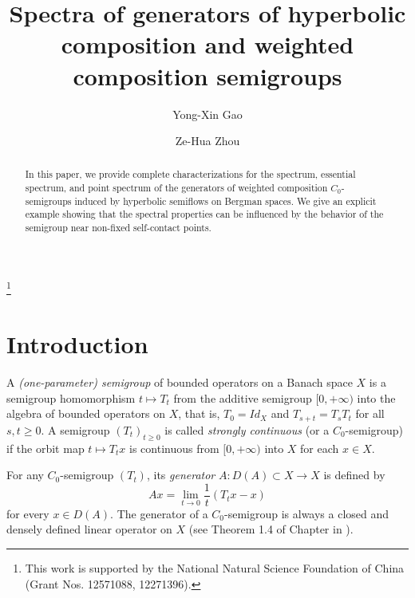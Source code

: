 \documentclass{amsart}
\theoremstyle{proclaim}
\theoremstyle{fancyproclaim}
\theoremstyle{definition}
\theoremstyle{fancystatement}
\numberwithin{equation}{section}
\begin{document}
\title[Spectra of hyperbolic weighted composition semigroups]{Spectra of generators of hyperbolic composition and weighted composition semigroups}

\author{Yong-Xin Gao}
\address{Yong-Xin Gao\\
School of Mathematical Sciences and LPMC, Nankai University, Tianjin 300071, P.R. China.}

\author{Ze-Hua Zhou}
\address{Ze-Hua Zhou\\
School of Mathematics, Tianjin University, Tianjin 300354, P.R. China.}


\date{}
\thanks{This work is supported by the National Natural Science Foundation of China (Grant Nos. 12571088, 12271396).}
\begin{abstract}
In this paper, we provide complete characterizations for the spectrum, essential spectrum, and point spectrum of the generators of weighted composition $C_0$-semigroups induced by hyperbolic semiflows on Bergman spaces. We give an explicit example showing that the spectral properties can be influenced by the behavior of the semigroup near non-fixed self-contact points.
\end{abstract}

\maketitle



\section{Introduction}\label{sec1}

A \emph{(one-parameter) semigroup} of bounded operators on a Banach space $X$ is a semigroup homomorphism $t\mapsto T_t$ from the additive semigroup $[0,+\infty)$ into the algebra of bounded operators on $X$, that is, $T_0 = Id_X$ and $T_{s+t} = T_sT_t$ for all $s,t\geq 0$. A semigroup $(T_t)_{t\geq0}$ is called \emph{strongly continuous} (or a $C_0$-semigroup) if the orbit map $t\mapsto T_tx$ is continuous from $[0,+\infty)$ into $X$ for each $x \in X$. 

For any $C_0$-semigroup $(T_t)$, its \emph{generator} $A : D(A) \subset X \to X$ is defined by
$$Ax=\lim_{t\to 0}\frac{1}{t}(T_tx-x)$$
for every $x \in D(A)$. The generator of a $C_0$-semigroup is always a closed and densely defined linear operator on $X$ (see Theorem 1.4 of Chapter \uppercase\expandafter{} in \cite{equ}).
\end{document}
